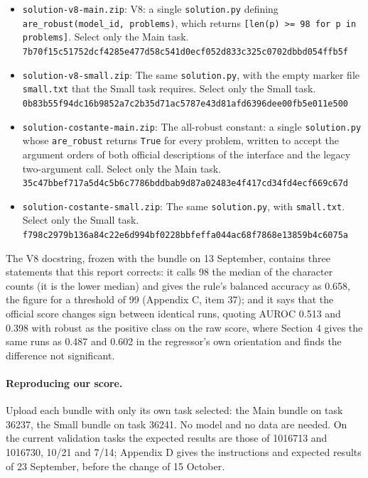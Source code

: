 \begin{itemize}

\item \texttt{solution-v8-main.zip}: V8: a single \texttt{solution.py} defining \texttt{are\_robust(model\_id, problems)}, which returns \texttt{[len(p) >= 98 for p in problems]}. Select only the Main task.\\
{\footnotesize\texttt{7b70f15c51752dcf4285e477d58c541d0ecf052d833c325c0702dbbd054ffb5f}}

\item \texttt{solution-v8-small.zip}: The same \texttt{solution.py}, with the empty marker file \texttt{small.txt} that the Small task requires. Select only the Small task.\\
{\footnotesize\texttt{0b83b55f94dc16b9852a7c2b35d71ac5787e43d81afd6396dee00fb5e011e500}}

\item \texttt{solution-costante-main.zip}: The all-robust constant: a single \texttt{solution.py} whose \texttt{are\_robust} returns \texttt{True} for every problem, written to accept the argument orders of both official descriptions of the interface and the legacy two-argument call. Select only the Main task.\\
{\footnotesize\texttt{35c47bbef717a5d4c5b6c7786bddbab9d87a02483e4f417cd34fd4ecf669c67d}}

\item \texttt{solution-costante-small.zip}: The same \texttt{solution.py}, with \texttt{small.txt}. Select only the Small task.\\
{\footnotesize\texttt{f798c2979b136a84c22e6d994bf0228bbfeffa044ac68f7868e13859b4c6075a}}

\end{itemize}

The V8 docstring, frozen with the bundle on 13 September, contains three statements that this report corrects: it calls 98 the median of the character counts (it is the lower median) and gives the rule's balanced accuracy as 0.658, the figure for a threshold of 99 (Appendix C, item 37); and it says that the official score changes sign between identical runs, quoting AUROC 0.513 and 0.398 with robust as the positive class on the raw score, where Section 4 gives the same runs as 0.487 and 0.602 in the regressor's own orientation and finds the difference not significant.

\paragraph{Reproducing our score.} Upload each bundle with only its own task selected: the Main bundle on task 36237, the Small bundle on task 36241. No model and no data are needed. On the current validation tasks the expected results are those of 1016713 and 1016730, 10/21 and 7/14; Appendix D gives the instructions and expected results of 23 September, before the change of 15 October.

